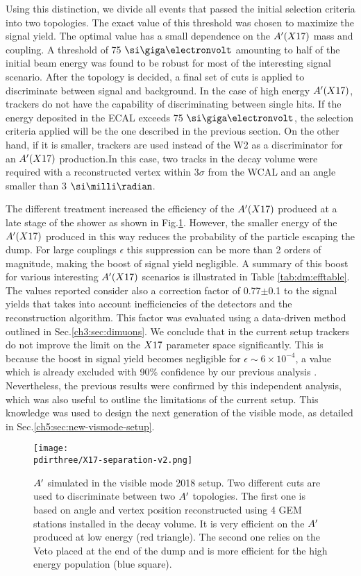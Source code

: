 Using this distinction, we divide all events that passed the initial selection criteria into two topologies.
The exact value of this threshold was chosen to maximize the signal yield. The optimal value has a small dependence on the $A'(X17)$ mass and coupling. A threshold of 75 $\gev$ amounting to half of the initial beam energy was found to be robust for most of the interesting signal scenario. After the topology is decided, a final set of cuts is applied to discriminate between signal and background. In the case of high energy $A'(X17)$, trackers do not have the capability of discriminating between single hits. If the energy deposited in the ECAL exceeds 75 $\gev$, the selection criteria applied will be the one described in the previous section. On the other hand, if it is smaller, trackers are used instead of the W2 as a discriminator for an $A'(X17)$ production.In this case, two tracks in the decay volume were required with a reconstructed vertex within 3$\sigma$ from the WCAL and an angle smaller than 3 $\mrad$.

The different treatment increased the efficiency of the $A'(X17)$ produced at a late stage of the shower as shown in Fig.\ref{fig:combined-analysis}. However, the smaller energy of the $A'(X17)$ produced in this way reduces the probability of the particle escaping the dump. For large couplings $\epsilon$ this suppression can be more than 2 orders of magnitude, making the boost of signal yield negligible. A summary of this boost for various interesting $A'(X17)$ scenarios is illustrated in Table \ref{tab:dm:efftable}. The values reported consider also a correction factor of 0.77$\pm$0.1 to the signal yields that takes into account inefficiencies of the detectors and the reconstruction algorithm. This factor was evaluated using a data-driven method outlined in Sec.\ref{ch3:sec:dimuons}. We conclude that in the current setup trackers do not improve the limit on the $X17$ parameter space significantly. This is because the boost in signal yield becomes negligible for $\epsilon \sim 6 \times 10^{-4}$, a value which is already excluded with 90\% confidence by our previous analysis \cite{Banerjee:2019hmi}. Nevertheless, the previous results were confirmed by this independent analysis, which was also useful to outline the limitations of the current setup. This knowledge was used to design the next generation of the visible mode, as detailed in Sec.\ref{ch5:sec:new-vismode-setup}.

\begin{figure}[tbh!]
  \centering
  \texttt{[image: \\pdirthree/X17-separation-v2.png]}
  \caption[Comparison of selected $\DM$ events between the calorimeter and tracking analysis]{$\DM$ simulated in the visible mode 2018 setup. Two different cuts are used to discriminate between two $\DM$ topologies. The first one is based on angle and vertex position reconstructed using 4 GEM stations installed in the decay volume. It is very efficient on the $\DM$ produced at low energy (red triangle). The second one relies on the Veto placed at the end of the dump and is more efficient for the high energy population (blue square).}
  \label{fig:combined-analysis}
\end{figure}

